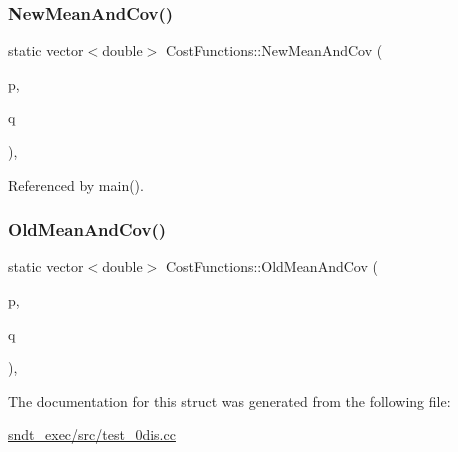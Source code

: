 \subsubsection{\texorpdfstring{New\+Mean\+And\+Cov()}{NewMeanAndCov()}}
{\footnotesize\ttfamily static vector$<$double$>$ Cost\+Functions\+::\+New\+Mean\+And\+Cov (\begin{DoxyParamCaption}\item[{\hyperlink{classNDTCell}{N\+D\+T\+Cell} $\ast$}]{p,  }\item[{\hyperlink{classNDTCell}{N\+D\+T\+Cell} $\ast$}]{q }\end{DoxyParamCaption})\hspace{0.3cm}{\ttfamily [inline]}, {\ttfamily [static]}}



Referenced by main().

\mbox{\label{structCostFunctions_af66a9ae54dbf19549b3e98636134d3a7}} 
\subsubsection{\texorpdfstring{Old\+Mean\+And\+Cov()}{OldMeanAndCov()}}
{\footnotesize\ttfamily static vector$<$double$>$ Cost\+Functions\+::\+Old\+Mean\+And\+Cov (\begin{DoxyParamCaption}\item[{\hyperlink{classNDTCell}{N\+D\+T\+Cell} $\ast$}]{p,  }\item[{\hyperlink{classNDTCell}{N\+D\+T\+Cell} $\ast$}]{q }\end{DoxyParamCaption})\hspace{0.3cm}{\ttfamily [inline]}, {\ttfamily [static]}}



The documentation for this struct was generated from the following file\+:\begin{DoxyCompactItemize}
\item 
\hyperlink{sndt__exec_2src_2test__0dis_8cc}{sndt\+\_\+exec/src/test\+\_\+0dis.\+cc}\end{DoxyCompactItemize}
